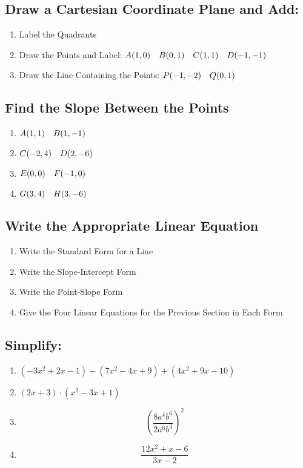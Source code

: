 \documentclass{article}
\begin{document}
    \subsection*{Draw a Cartesian Coordinate Plane and Add:}
    \begin{enumerate}
        \item Label the Quadrants
        \item Draw the Points and Label: \quad $A(1,0) \text{\quad} B(0,1) \text{\quad} C(1,1) \text{\quad} D(-1,-1)$
        \item Draw the Line Containing the Points: \quad $P(-1,-2) \text{\quad} Q(0,1)$
    \end{enumerate}
    
    \subsection*{Find the Slope Between the Points}
    \begin{enumerate}
        \item $A(1,1) \text{\quad} B(1,-1)$
        \item $C(-2,4) \text{\quad} D(2,-6)$
        \item $E(0,0) \text{\quad} F(-1,0)$
        \item $G(3,4) \text{\quad} H(3,-6)$
    \end{enumerate}
    
    \subsection*{Write the Appropriate Linear Equation}
    \begin{enumerate}
        \item Write the Standard Form for a Line
        \item Write the Slope-Intercept Form
        \item Write the Point-Slope Form
        \item Give the Four Linear Equations for the Previous Section in Each Form
        
    \end{enumerate}
    
    \subsection*{Simplify:}
    \begin{enumerate}
        \item $(-3x^2 + 2x - 1) - (7x^2 - 4x + 9) + (4x^2 + 9x - 10)$
        \item $(2x + 3) \cdot (x^2 -3x + 1)$
        \item $$\left( \frac{8a^4b^6}{2a^6b^3}\right)^{\!2}$$
        \item $$ \frac{12x^2 + x - 6}{3x - 2} $$
    \end{enumerate}
\end{document}
